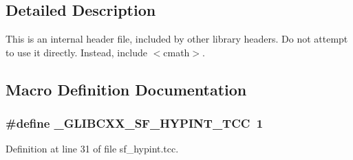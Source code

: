 \subsection{Detailed Description}
This is an internal header file, included by other library headers. Do not attempt to use it directly. Instead, include $<$cmath$>$. 

\subsection{Macro Definition Documentation}
\hypertarget{sf__hypint_8tcc_acf643c2e2a7b3fab7ab4a8be18e29584}{}
\subsubsection[{\+\_\+\+G\+L\+I\+B\+C\+X\+X\+\_\+\+S\+F\+\_\+\+H\+Y\+P\+I\+N\+T\+\_\+\+T\+C\+C}]{\setlength{\rightskip}{0pt plus 5cm}\#define \+\_\+\+G\+L\+I\+B\+C\+X\+X\+\_\+\+S\+F\+\_\+\+H\+Y\+P\+I\+N\+T\+\_\+\+T\+C\+C~1}\label{sf__hypint_8tcc_acf643c2e2a7b3fab7ab4a8be18e29584}


Definition at line 31 of file sf\+\_\+hypint.\+tcc.

